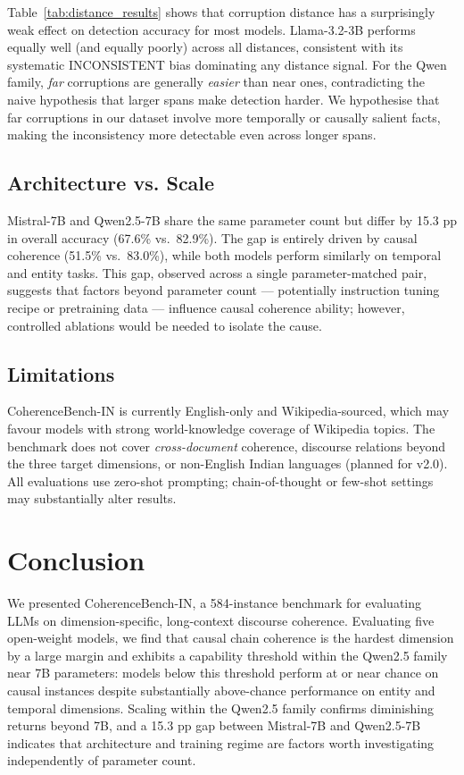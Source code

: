 \documentclass[conference]{IEEEtran}
\begin{document}
Table~\ref{tab:distance_results} shows that corruption distance has
a surprisingly weak effect on detection accuracy for most models.
Llama-3.2-3B performs equally well (and equally poorly) across all distances,
consistent with its systematic INCONSISTENT bias dominating any distance signal.
For the Qwen family, \emph{far} corruptions are generally \emph{easier} than near ones,
contradicting the naive hypothesis that larger spans make detection harder.
We hypothesise that far corruptions in our dataset involve more temporally
or causally salient facts, making the inconsistency more detectable
even across longer spans.

\subsection{Architecture vs. Scale}
Mistral-7B and Qwen2.5-7B share the same parameter count but differ
by 15.3 pp in overall accuracy (67.6\% vs.\ 82.9\%).
The gap is entirely driven by causal coherence (51.5\% vs.\ 83.0\%),
while both models perform similarly on temporal and entity tasks.
This gap, observed across a single parameter-matched pair, suggests that factors beyond parameter count ---
potentially instruction tuning recipe or pretraining data ---
influence causal coherence ability; however, controlled ablations would be needed to isolate the cause.

\subsection{Limitations}
CoherenceBench-IN is currently English-only and Wikipedia-sourced,
which may favour models with strong world-knowledge coverage of Wikipedia topics.
The benchmark does not cover \emph{cross-document} coherence,
discourse relations beyond the three target dimensions,
or non-English Indian languages (planned for v2.0).
All evaluations use zero-shot prompting;
chain-of-thought or few-shot settings may substantially alter results.

\section{Conclusion}
We presented CoherenceBench-IN,
a 584-instance benchmark for evaluating LLMs on dimension-specific,
long-context discourse coherence.
Evaluating five open-weight models, we find that
causal chain coherence is the hardest dimension by a large margin
and exhibits a capability threshold within the Qwen2.5 family near 7B parameters:
models below this threshold perform at or near chance on causal instances
despite substantially above-chance performance on entity and temporal dimensions.
Scaling within the Qwen2.5 family confirms diminishing returns beyond 7B,
and a 15.3 pp gap between Mistral-7B and Qwen2.5-7B indicates
that architecture and training regime are factors worth investigating independently of parameter count.
\end{document}
